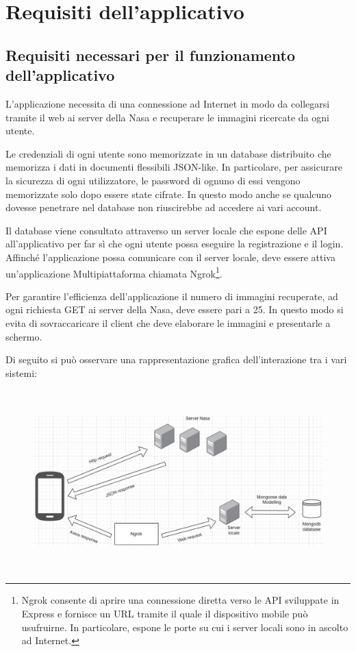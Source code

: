 \section{Requisiti dell'applicativo}
\subsection{Requisiti necessari per il funzionamento dell'applicativo}

L'applicazione necessita di una connessione ad Internet in modo da collegarsi
tramite il web ai server della Nasa e recuperare le immagini ricercate da ogni utente.

Le credenziali di ogni utente sono memorizzate in un database distribuito che memorizza i dati in documenti flessibili JSON-like. In particolare, per assicurare la sicurezza di ogni utilizzatore, le password di ognuno di essi vengono memorizzate
solo dopo essere state cifrate. In questo modo anche se qualcuno dovesse penetrare nel database non riuscirebbe ad accedere ai vari account.

Il database viene consultato attraverso un server locale che espone delle API all'applicativo per far s\`i che ogni utente possa eseguire la registrazione e il login.
Affinch\'e l'applicazione possa comunicare con il server locale, deve essere attiva un'applicazione Multipiattaforma chiamata Ngrok\footnote{Ngrok consente di aprire una connessione diretta verso le API sviluppate in Express e fornisce un URL tramite il quale il dispositivo mobile pu\`o usufruirne. In particolare, espone le porte su cui i server locali sono in ascolto ad Internet.}.


Per garantire l'efficienza dell'applicazione il numero di immagini recuperate, ad ogni richiesta GET ai server della Nasa, deve essere pari a 25. In questo modo si evita di sovraccaricare il client che deve elaborare le immagini e presentarle a schermo.

Di seguito si pu\`o osservare una rappresentazione grafica dell'interazione tra i vari sistemi:
\begin{figure}[h]
    \centering
    \includegraphics[width=13cm, height=7cm]{images/ModelloDiComunicazioneApplicazione.jpg}
    \caption[differenzeiteot]{}
    \label{fig:modellodicomunicazione}
\end{figure}
